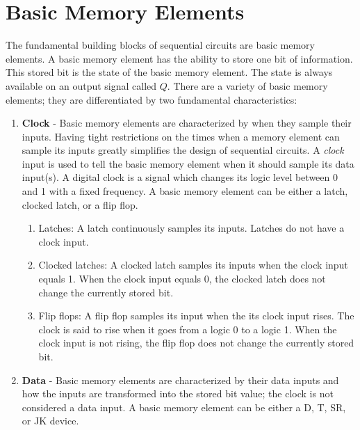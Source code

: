 \section{Basic Memory Elements}
The fundamental building blocks of sequential circuits are basic memory
elements.  A basic memory element has the ability to store one bit of 
information.  This stored bit is the state of the basic memory element.
The state is always available on an output signal called $Q$.  
There are a variety of basic memory elements; they are 
differentiated by two fundamental characteristics:

\begin{enumerate}
\item {\bf Clock} - Basic memory elements are characterized by 
when they sample their inputs.  Having tight restrictions on the
times when a memory element can sample its inputs greatly 
simplifies the design of sequential circuits.  A {\it clock}
input is used to tell the basic memory element when it should sample 
its data input(s).  A digital clock is a signal which 
changes its logic level between 0 and 1 with a fixed frequency.
A basic memory element can be either a latch, clocked latch, or
a flip flop.

\begin{enumerate}

\item Latches: A latch continuously samples its inputs.  
Latches do not have a clock input.

\item Clocked latches: A clocked latch samples its inputs when 
the clock input equals 1.  When the clock input equals 0, the 
clocked latch does not change the currently stored bit.

\item Flip flops: A flip flop samples its input when the its 
clock input rises.  The clock is said to rise when it goes 
from a logic 0 to a logic 1.  When the clock input is not rising, 
the flip flop does not change the currently stored bit.
\end{enumerate}


\item {\bf Data} - Basic memory elements are characterized by 
their data inputs and how the inputs are transformed into the 
stored bit value; the clock is not considered a data input.
A basic memory element can be either a D, T, SR, or JK device.

\begin{enumerate}


\end{enumerate}
\end{enumerate}
